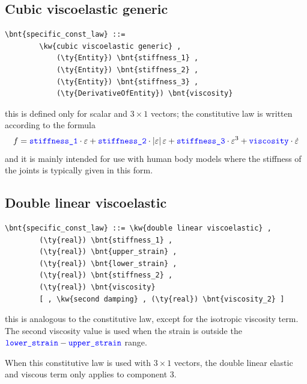 \subsection{Cubic viscoelastic generic}
\begin{Verbatim}[commandchars=\\\{\}]
    \bnt{specific_const_law} ::= 
        \kw{cubic viscoelastic generic} ,
            (\ty{Entity}) \bnt{stiffness_1} ,
            (\ty{Entity}) \bnt{stiffness_2} ,
            (\ty{Entity}) \bnt{stiffness_3} ,
            (\ty{DerivativeOfEntity}) \bnt{viscosity}
\end{Verbatim}
this is defined only for scalar and $3 \times 1$ vectors; the constitutive
law is written according to the formula
\begin{displaymath}
	f = \textcolor{blue}{\texttt{stiffness\_1}} \cdot \varepsilon
	+ \textcolor{blue}{\texttt{stiffness\_2}} \cdot \left| \varepsilon \right|\varepsilon
	+ \textcolor{blue}{\texttt{stiffness\_3}} \cdot \varepsilon^3
	+ \textcolor{blue}{\texttt{viscosity}} \cdot \dot{\varepsilon}
\end{displaymath}
and it is mainly intended for use with human body models 
where the stiffness of the joints is typically given in this form.

\subsection{Double linear viscoelastic}
\begin{Verbatim}[commandchars=\\\{\}]
    \bnt{specific_const_law} ::= \kw{double linear viscoelastic} ,
        (\ty{real}) \bnt{stiffness_1} ,
        (\ty{real}) \bnt{upper_strain} ,
        (\ty{real}) \bnt{lower_strain} ,
        (\ty{real}) \bnt{stiffness_2} ,
        (\ty{real}) \bnt{viscosity}
        [ , \kw{second damping} , (\ty{real}) \bnt{viscosity_2} ]
\end{Verbatim}
this is analogous to the  constitutive law,
except for the isotropic viscosity term.
The second viscosity value is used when the strain is outside the
$\textcolor{blue}{\texttt{lower\_strain}} - \textcolor{blue}{\texttt{upper\_strain}}$ range.

When this constitutive law is used with $3 \times 1$ vectors, 
the double linear elastic and viscous term only applies to component 3.
  
